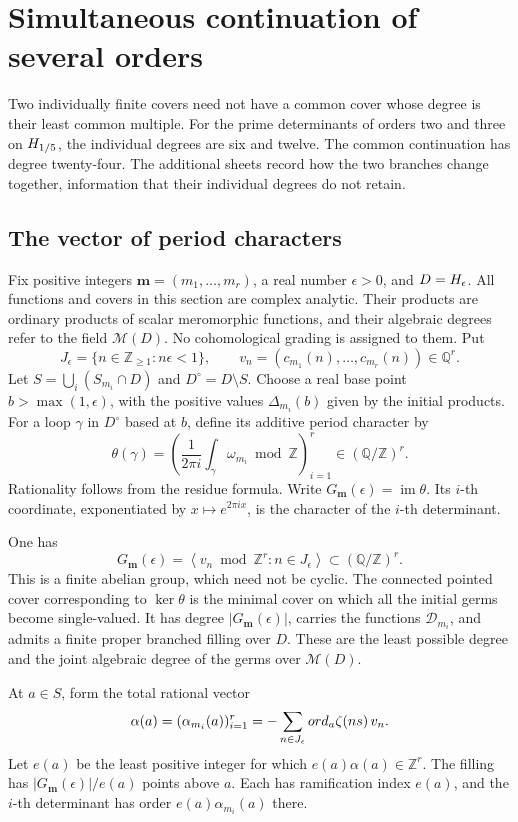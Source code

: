 \section{Simultaneous continuation of several orders}
\label{sec:simultaneous-covers}

Two individually finite covers need not have a common cover whose degree
is their least common multiple.  For the prime determinants of orders two
and three on \(H_{1/5}\), the individual degrees are six and twelve.
The common continuation has degree twenty-four.  The additional sheets
record how the two branches change together, information that their
individual degrees do not retain.

\subsection{The vector of period characters}

Fix positive integers \(\mathbf m=(m_1,\ldots,m_r)\), a real number
\(\epsilon>0\), and \(D=H_\epsilon\).  All functions and covers in
this section are complex analytic.  Their products are ordinary products
of scalar meromorphic functions, and their algebraic degrees refer to the
field \(\mathcal M(D)\).  No cohomological grading is assigned to them.
Put
\[
 J_\epsilon=\{n\in\mathbb Z_{\geq1}:n\epsilon<1\},\qquad
 v_n=(c_{m_1}(n),\ldots,c_{m_r}(n))\in\mathbb Q^r.
\]
Let \(S=\bigcup_i(S_{m_i}\cap D)\) and \(D^\circ=D\setminus S\).
Choose a real base point \(b>\max(1,\epsilon)\), with the positive
values \(\Delta_{m_i}(b)\) given by the initial products.  For a loop
\(\gamma\) in \(D^\circ\) based at \(b\), define its additive period
character by
\[
 \theta(\gamma)=
 \left(\frac1{2\pi i}\int_\gamma\omega_{m_i}\bmod\mathbb Z\right)_{i=1}^r
 \in(\mathbb Q/\mathbb Z)^r.
\]
Rationality follows from the residue formula.  Write
\(G_{\mathbf m}(\epsilon)=\operatorname{im}\theta\).
Its \(i\)-th coordinate, exponentiated by \(x\mapsto e^{2\pi ix}\),
is the character of the \(i\)-th determinant.

\begin{theorem}
\label{thm:simultaneous-character}
One has
\[
 G_{\mathbf m}(\epsilon)
 =\left\langle v_n\bmod\mathbb Z^r:n\in J_\epsilon\right\rangle
 \subset(\mathbb Q/\mathbb Z)^r.
\]
This is a finite abelian group, which need not be cyclic.
The connected pointed cover corresponding to \(\ker\theta\) is the
minimal cover on which all the initial germs become single-valued.
It has degree \(|G_{\mathbf m}(\epsilon)|\), carries the functions
\(\mathcal D_{m_i}\), and admits a finite proper branched filling over
\(D\).  These are the least possible degree and the joint algebraic
degree of the germs over \(\mathcal M(D)\).

At \(a\in S\), form the total rational vector
\[
 \alpha(a)=(\alpha_{m_i}(a))_{i=1}^r
 =-\sum_{n\in J_\epsilon}ord_a\zeta(ns)\,v_n.
\]
Let \(e(a)\) be the least positive integer for which
\(e(a)\alpha(a)\in\mathbb Z^r\).  The filling has
\(|G_{\mathbf m}(\epsilon)|/e(a)\) points above \(a\).
Each has ramification index \(e(a)\), and the \(i\)-th determinant
has order \(e(a)\alpha_{m_i}(a)\) there.
\end{theorem}

